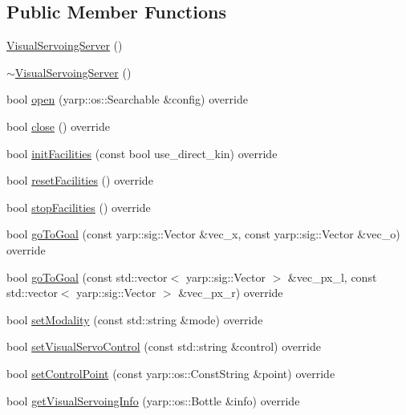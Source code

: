 \subsection*{Public Member Functions}
\begin{DoxyCompactItemize}
\item 
\hyperlink{classVisualServoingServer_a35df4de4c8cdb167b3eb15403beae653}{Visual\+Servoing\+Server} ()
\item 
\hyperlink{classVisualServoingServer_abb0f23eae68c9f453a5d66051744cadf}{$\sim$\+Visual\+Servoing\+Server} ()
\item 
bool \hyperlink{classVisualServoingServer_a0698977ddac02801eba3c35b47b9aa19}{open} (yarp\+::os\+::\+Searchable \&config) override
\item 
bool \hyperlink{classVisualServoingServer_ad9679d0bc524de74f4e96a1e8be23ca0}{close} () override
\item 
bool \hyperlink{classVisualServoingServer_a136cfac8840eda92c012851149b8624a}{init\+Facilities} (const bool use\+\_\+direct\+\_\+kin) override
\item 
bool \hyperlink{classVisualServoingServer_a39ea1de5ec159bd6779929c2bff84450}{reset\+Facilities} () override
\item 
bool \hyperlink{classVisualServoingServer_a0cd7a77750df9c1faaf1a18be6305de9}{stop\+Facilities} () override
\item 
bool \hyperlink{classVisualServoingServer_a085bb298e50f295d670bff6e4cb808d8}{go\+To\+Goal} (const yarp\+::sig\+::\+Vector \&vec\+\_\+x, const yarp\+::sig\+::\+Vector \&vec\+\_\+o) override
\item 
bool \hyperlink{classVisualServoingServer_a40ab9e9804793a58243077f31a2d79a4}{go\+To\+Goal} (const std\+::vector$<$ yarp\+::sig\+::\+Vector $>$ \&vec\+\_\+px\+\_\+l, const std\+::vector$<$ yarp\+::sig\+::\+Vector $>$ \&vec\+\_\+px\+\_\+r) override
\item 
bool \hyperlink{classVisualServoingServer_a6adf93e234e936879efe30cb9788b7ad}{set\+Modality} (const std\+::string \&mode) override
\item 
bool \hyperlink{classVisualServoingServer_a4a3ab24e71fed8052b04a9775cc86764}{set\+Visual\+Servo\+Control} (const std\+::string \&control) override
\item 
bool \hyperlink{classVisualServoingServer_a437c76c0ac9751cab05c76cd1f571d9b}{set\+Control\+Point} (const yarp\+::os\+::\+Const\+String \&point) override
\item 
bool \hyperlink{classVisualServoingServer_a66db1dfa1ebde34ada94bc36248e2ec8}{get\+Visual\+Servoing\+Info} (yarp\+::os\+::\+Bottle \&info) override

\end{DoxyCompactItemize}
